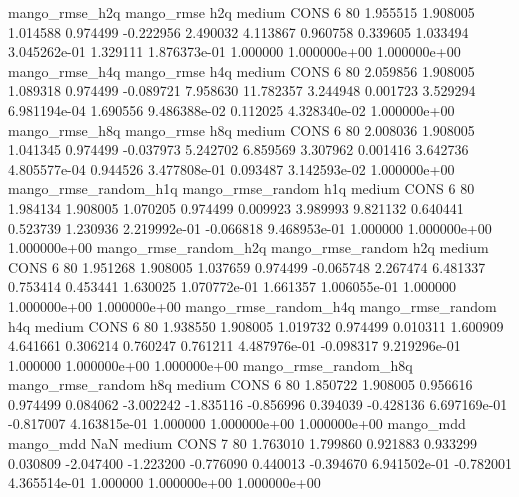        mango_rmse_h2q        mango_rmse                  h2q     medium     CONS                 6 80  1.955515       1.908005 1.014588       0.974499   -0.222956      2.490032      4.113867     0.960758       0.339605  1.033494 3.045262e-01     1.329111   1.876373e-01            1.000000    1.000000e+00        1.000000e+00
       mango_rmse_h4q        mango_rmse                  h4q     medium     CONS                 6 80  2.059856       1.908005 1.089318       0.974499   -0.089721      7.958630     11.782357     3.244948       0.001723  3.529294 6.981194e-04     1.690556   9.486388e-02            0.112025    4.328340e-02        1.000000e+00
       mango_rmse_h8q        mango_rmse                  h8q     medium     CONS                 6 80  2.008036       1.908005 1.041345       0.974499   -0.037973      5.242702      6.859569     3.307962       0.001416  3.642736 4.805577e-04     0.944526   3.477808e-01            0.093487    3.142593e-02        1.000000e+00
mango_rmse_random_h1q mango_rmse_random                  h1q     medium     CONS                 6 80  1.984134       1.908005 1.070205       0.974499    0.009923      3.989993      9.821132     0.640441       0.523739  1.230936 2.219992e-01    -0.066818   9.468953e-01            1.000000    1.000000e+00        1.000000e+00
mango_rmse_random_h2q mango_rmse_random                  h2q     medium     CONS                 6 80  1.951268       1.908005 1.037659       0.974499   -0.065748      2.267474      6.481337     0.753414       0.453441  1.630025 1.070772e-01     1.661357   1.006055e-01            1.000000    1.000000e+00        1.000000e+00
mango_rmse_random_h4q mango_rmse_random                  h4q     medium     CONS                 6 80  1.938550       1.908005 1.019732       0.974499    0.010311      1.600909      4.641661     0.306214       0.760247  0.761211 4.487976e-01    -0.098317   9.219296e-01            1.000000    1.000000e+00        1.000000e+00
mango_rmse_random_h8q mango_rmse_random                  h8q     medium     CONS                 6 80  1.850722       1.908005 0.956616       0.974499    0.084062     -3.002242     -1.835116    -0.856996       0.394039 -0.428136 6.697169e-01    -0.817007   4.163815e-01            1.000000    1.000000e+00        1.000000e+00
            mango_mdd         mango_mdd                  NaN     medium     CONS                 7 80  1.763010       1.799860 0.921883       0.933299    0.030809     -2.047400     -1.223200    -0.776090       0.440013 -0.394670 6.941502e-01    -0.782001   4.365514e-01            1.000000    1.000000e+00        1.000000e+00
